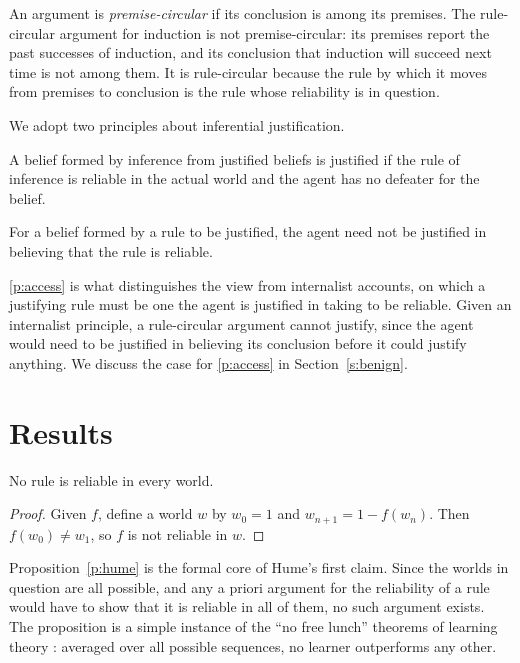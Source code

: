 \documentclass{situationist-preprint}
\begin{document}
An argument is \emph{premise-circular} if its conclusion is among its premises. The rule-circular argument for induction is not premise-circular: its premises report the past successes of induction, and its conclusion that induction will succeed next time is not among them. It is rule-circular because the rule by which it moves from premises to conclusion is the rule whose reliability is in question.

We adopt two principles about inferential justification.

\begin{principle}[Reliabilism]\label{p:rel}
A belief formed by inference from justified beliefs is justified if the rule of inference is reliable in the actual world and the agent has no defeater for the belief.
\end{principle}

\begin{principle}\label{p:access}
For a belief formed by a rule to be justified, the agent need not be justified in believing that the rule is reliable.
\end{principle}

\ref{p:access} is what distinguishes the view from internalist accounts, on which a justifying rule must be one the agent is justified in taking to be reliable. Given an internalist principle, a rule-circular argument cannot justify, since the agent would need to be justified in believing its conclusion before it could justify anything. We discuss the case for \ref{p:access} in Section~\ref{s:benign}.

\section{Results}\label{s:results}

\begin{proposition}[Hume]\label{p:hume}
No rule is reliable in every world.
\end{proposition}

\begin{proof}
Given $f$, define a world $w$ by $w_0 = 1$ and $w_{n+1} = 1 - f(w_n)$. Then $f(w_0) \neq w_1$, so $f$ is not reliable in $w$.
\end{proof}

Proposition~\ref{p:hume} is the formal core of Hume's first claim. Since the worlds in question are all possible, and any a priori argument for the reliability of a rule would have to show that it is reliable in all of them, no such argument exists. The proposition is a simple instance of the \enquote{no free lunch} theorems of learning theory \citep{Wolpert1996,SterkenburgGrunwald2021}: averaged over all possible sequences, no learner outperforms any other.
\end{document}
